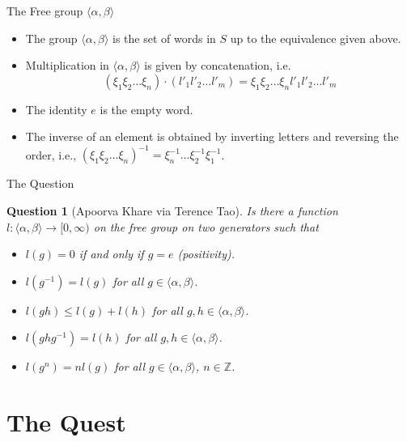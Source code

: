 \documentclass[aspectratio=1610,17pt, ucs]{beamer}
\newcommand{\F}{\langle \alpha, \beta \rangle}
\newtheorem{question}{Question}
\begin{document}
\begin{frame}{The Free group $\F$}
  \begin{itemize}[<+->]
    \item The group $\F$ is the set of words in $S$ up to the equivalence given above.
    \item Multiplication in $\F$ is given by concatenation, i.e.
  $$(\xi_1\xi_2\dots \xi_n) \cdot (l'_1l'_2\dots l'_m) = \xi_1\xi_2\dots \xi_nl'_1l'_2\dots l'_m$$
    \item The identity $e$ is the empty word.
    \item The inverse of an element is obtained by inverting letters and reversing the order, i.e., $(\xi_1\xi_2\dots \xi_n)^{-1}=\xi_n^{-1}\dots \xi_2^{-1}\xi_1^{-1}$.
  \end{itemize}
  
\end{frame}

\begin{frame}{The Question}
  \pause
  \begin{question}[Apoorva Khare via Terence Tao]
    Is there a function $l: \langle \alpha, \beta\rangle \to [0, \infty)$ on the free group on two generators such that \pause
    \begin{itemize}[<+->]
      \item $l(g) = 0$ if and \alert{only if} $g = e$ (\alert{positivity}).
      \item $l(g^{-1}) = l(g)$ for all $g\in \langle \alpha, \beta\rangle$.
      \item $l(gh) \leq l(g)+ l(h)$ for all $g, h\in \langle \alpha, \beta\rangle$.
      \item $l(ghg^{-1}) = l(h)$ for all $g, h\in \langle \alpha, \beta\rangle$.
      \item $l(g^n) = nl(g)$ for all $g\in \langle \alpha, \beta\rangle$, $n\in\mathbb{Z}$.
    \end{itemize}
\end{question}

\end{frame}

\section{The Quest}
\end{document}
